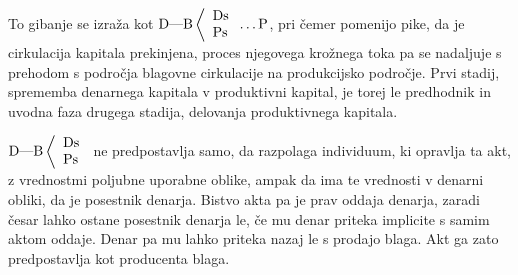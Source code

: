 \documentclass[kapital_02.tex]{subfiles}
\begin{document}
To gibanje se izraža kot \( 
    \textrm{D}\textrm{---}\textrm{B}\left< 
    \begin{array}{l}
        \textrm{Ds}\\
        \textrm{Ps}\\
    \end{array}
    \right.\textrm{\dots}\textrm{P} 
\), pri čemer pomenijo pike, da je cirkulacija kapitala prekinjena, proces njegovega krožnega toka pa se nadaljuje s prehodom s področja blagovne cirkulacije na produkcijsko področje. Prvi stadij, sprememba denarnega kapitala v produktivni kapital, je torej le predhodnik in uvodna faza drugega stadija, delovanja produktivnega kapitala.

\( 
    \textrm{D}\textrm{---}\textrm{B}\left< 
    \begin{array}{l}
        \textrm{Ds}\\
        \textrm{Ps}\\
    \end{array}
    \right. 
\) ne predpostavlja samo, da razpolaga individuum, ki opravlja ta akt, z vrednostmi poljubne uporabne oblike, ampak da ima te vrednosti v denarni obliki, da je posestnik denarja. Bistvo akta pa je prav oddaja denarja, zaradi česar lahko ostane posestnik denarja le, če mu denar priteka implicite s samim aktom oddaje. Denar pa mu lahko priteka nazaj le s prodajo blaga. Akt ga zato predpostavlja kot producenta blaga.
\end{document}

